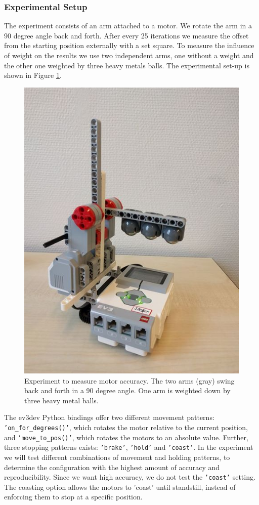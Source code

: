 \documentclass[11pt, a4paper]{article}
\begin{document}
	\subsubsection*{Experimental Setup}
	The experiment consists of an arm attached to a motor. We rotate the arm in a 90 degree angle back and forth. After every 25 iterations we measure the offset from the starting position externally with a set square. To measure the influence of weight on the results we use two independent arms, one without a weight and the other one weighted by three heavy metals balls. The experimental set-up is shown in Figure \ref{fig:angle_experiment}.
	
	\begin{figure}[H]
		\centering
		\includegraphics[width=0.35\linewidth]{images/angle_experiment}
		\caption{Experiment to measure motor accuracy. The two arms (gray) swing back and forth in a 90 degree angle. One arm is weighted down by three heavy metal balls.}
		\label{fig:angle_experiment}
	\end{figure}
	
	
	
	The ev3dev Python bindings offer two different movement patterns: \texttt{'on\_for\_degrees()'}, which rotates the motor relative to the current position, and \texttt{'move\_to\_pos()'}, which rotates the motors to an absolute value.  Further, three stopping patterns exists: \texttt{'brake'}, \texttt{'hold'} and \texttt{'coast'}. In the experiment we will test different combinations of movement and holding patterns, to determine the configuration with the highest amount of accuracy and reproducibility. Since we want high accuracy, we do not test the \texttt{'coast'} setting. The coasting option allows the motors to 'coast' until standstill, instead of enforcing them to stop at a specific position. 
	
\end{document}
